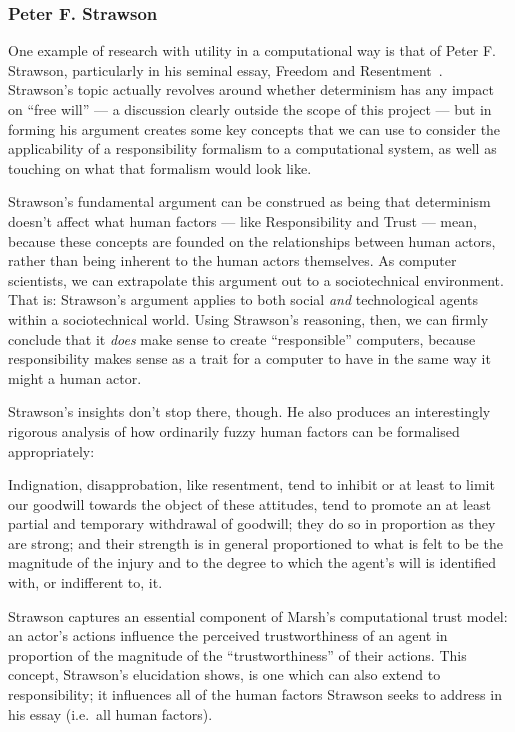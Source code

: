 \subsubsection{Peter F. Strawson}\label{sec:strawson}
One example of research with utility in a computational way is that of Peter F. Strawson, particularly in his seminal essay, Freedom and Resentment~\cite{strawson}. Strawson's topic actually revolves around whether determinism has any impact on ``free will'' --- a discussion clearly outside the scope of this project --- but in forming his argument creates some key concepts that we can use to consider the applicability of a responsibility formalism to a computational system, as well as touching on what that formalism would look like.\par

Strawson's fundamental argument can be construed as being that determinism doesn't affect what human factors --- like Responsibility and Trust --- mean, because these concepts are founded on the relationships between human actors, rather than being inherent to the human actors themselves. As computer scientists, we can extrapolate this argument out to a sociotechnical environment. That is: Strawson's argument applies to both social \emph{and} technological agents within a sociotechnical world. Using Strawson's reasoning, then, we can firmly conclude that it \emph{does} make sense to create ``responsible'' computers, because responsibility makes sense as a trait for a computer to have in the same way it might a human actor.\par

Strawson's insights don't stop there, though. He also produces an interestingly rigorous analysis of how ordinarily fuzzy human factors can be formalised appropriately:

\begin{displayquote}
    Indignation, disapprobation, like resentment, tend to inhibit or at least to limit our goodwill towards the object of these attitudes, tend to promote an at least partial and temporary withdrawal of goodwill; they do so in proportion as they are strong; and their strength is in general proportioned to what is felt to be the magnitude of the injury and to the degree to which the agent’s will is identified with, or indifferent to, it.
\end{displayquote}\cite{strawson}\par

Strawson captures an essential component of Marsh's computational trust model: an actor's actions influence the perceived trustworthiness of an agent in proportion of the magnitude of the ``trustworthiness'' of their actions. This concept, Strawson's elucidation shows, is one which can also extend to responsibility; it influences all of the human factors Strawson seeks to address in his essay (i.e.\ all human factors).\par

